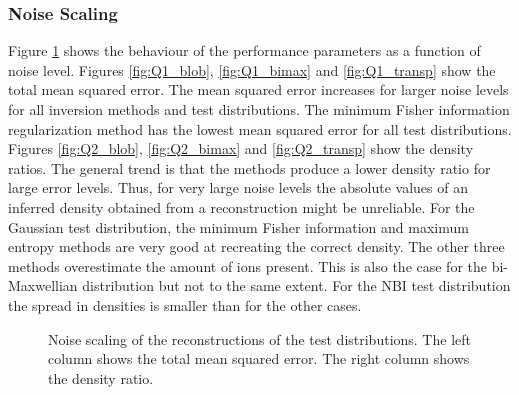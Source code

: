 \subsubsection{Noise Scaling}
Figure \ref{fig:Qfigs_tomos} shows the behaviour of the performance parameters as a function of noise level. Figures \ref{fig:Q1_blob}, \ref{fig:Q1_bimax} and \ref{fig:Q1_transp} show the total mean squared error.
The mean squared error increases for larger noise levels for all inversion methods and test distributions. 
The minimum Fisher information regularization method has the lowest mean squared error for all test distributions. 
Figures \ref{fig:Q2_blob}, \ref{fig:Q2_bimax} and \ref{fig:Q2_transp} show the density ratios. The general trend is that the methods produce a lower density ratio for large error levels. Thus, for very large noise levels the absolute values of an inferred density obtained from a reconstruction might be unreliable. For the Gaussian test distribution, the minimum Fisher information and maximum entropy methods are very good at recreating the correct density. The other three methods overestimate the amount of ions present. This is also the case for the bi-Maxwellian distribution but not to the same extent. 
For the NBI test distribution the spread in densities is smaller than for the other cases.
\begin{figure}
    \centering
    \caption{Noise scaling of the reconstructions of the test distributions. The left column shows the total mean squared error. The right column shows the density ratio. }
    \label{fig:Qfigs_tomos}
\end{figure}

